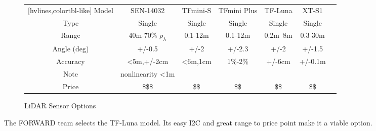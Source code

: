 \begin{figure}[h]
	\centering
	\setlength{\tabcolsep}{5pt} %
	\renewcommand{\arraystretch}{1.5} %
	\begin{NiceTabular}{ccccccc}[hvlines,colortbl-like]
		\CodeBefore
		\columncolor{}{}
		\Body
		Model       & SEN-14032               & TFmini-S & TFmini Plus & TF-Luna & XT-S1   \\
		Type        & Single 				  & Single   & Single      & Single  & Single  \\
		Range       & 40m-70\% $\rho_\lambda$ & 0.1-12m  & 0.1-12m     & 0.2m~8m & 0.3-30m \\
		Angle (deg) & +/-0.5                  & +/-2     & +/-2.3      & +/-2    & +/-1.5  \\
		Accuracy    & <5m,+/-2cm              & <6m,1cm  & 1\%-2\%     & +/-6cm  & +/-0.1m \\
		Note        & nonlinearity <1m        &  &  &  & \\
		Price       & \$\$\$                  & \$\$     & \$\$        & \$\$    & \$\$
	\end{NiceTabular}
	\caption{\label{fig:compareLiDAR}LiDAR Sensor Options}
\end{figure}

\noindent The FORWARD team selects the TF-Luna model. Its easy I2C and great range to price point make it a viable option.\\


